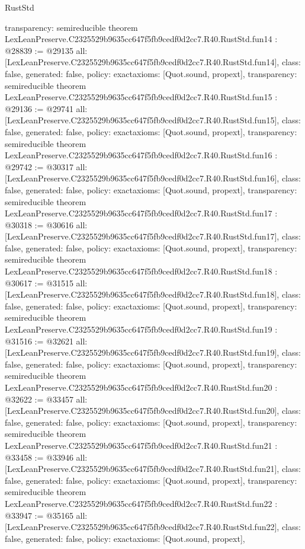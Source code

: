 \begin{lexlean}{RustStd}
\begin{coremodule}
{  transparency: semireducible
}
theorem LexLeanPreserve.C2325529b9635cc647f5fb9cedf0d2cc7.R40.RustStd.fun14 : @28839 := @29135 {
  all: [LexLeanPreserve.C2325529b9635cc647f5fb9cedf0d2cc7.R40.RustStd.fun14],
  class: false,
  generated: false,
  policy: exact{axioms: [Quot.sound, propext]},
  transparency: semireducible
}
theorem LexLeanPreserve.C2325529b9635cc647f5fb9cedf0d2cc7.R40.RustStd.fun15 : @29136 := @29741 {
  all: [LexLeanPreserve.C2325529b9635cc647f5fb9cedf0d2cc7.R40.RustStd.fun15],
  class: false,
  generated: false,
  policy: exact{axioms: [Quot.sound, propext]},
  transparency: semireducible
}
theorem LexLeanPreserve.C2325529b9635cc647f5fb9cedf0d2cc7.R40.RustStd.fun16 : @29742 := @30317 {
  all: [LexLeanPreserve.C2325529b9635cc647f5fb9cedf0d2cc7.R40.RustStd.fun16],
  class: false,
  generated: false,
  policy: exact{axioms: [Quot.sound, propext]},
  transparency: semireducible
}
theorem LexLeanPreserve.C2325529b9635cc647f5fb9cedf0d2cc7.R40.RustStd.fun17 : @30318 := @30616 {
  all: [LexLeanPreserve.C2325529b9635cc647f5fb9cedf0d2cc7.R40.RustStd.fun17],
  class: false,
  generated: false,
  policy: exact{axioms: [Quot.sound, propext]},
  transparency: semireducible
}
theorem LexLeanPreserve.C2325529b9635cc647f5fb9cedf0d2cc7.R40.RustStd.fun18 : @30617 := @31515 {
  all: [LexLeanPreserve.C2325529b9635cc647f5fb9cedf0d2cc7.R40.RustStd.fun18],
  class: false,
  generated: false,
  policy: exact{axioms: [Quot.sound, propext]},
  transparency: semireducible
}
theorem LexLeanPreserve.C2325529b9635cc647f5fb9cedf0d2cc7.R40.RustStd.fun19 : @31516 := @32621 {
  all: [LexLeanPreserve.C2325529b9635cc647f5fb9cedf0d2cc7.R40.RustStd.fun19],
  class: false,
  generated: false,
  policy: exact{axioms: [Quot.sound, propext]},
  transparency: semireducible
}
theorem LexLeanPreserve.C2325529b9635cc647f5fb9cedf0d2cc7.R40.RustStd.fun20 : @32622 := @33457 {
  all: [LexLeanPreserve.C2325529b9635cc647f5fb9cedf0d2cc7.R40.RustStd.fun20],
  class: false,
  generated: false,
  policy: exact{axioms: [Quot.sound, propext]},
  transparency: semireducible
}
theorem LexLeanPreserve.C2325529b9635cc647f5fb9cedf0d2cc7.R40.RustStd.fun21 : @33458 := @33946 {
  all: [LexLeanPreserve.C2325529b9635cc647f5fb9cedf0d2cc7.R40.RustStd.fun21],
  class: false,
  generated: false,
  policy: exact{axioms: [Quot.sound, propext]},
  transparency: semireducible
}
theorem LexLeanPreserve.C2325529b9635cc647f5fb9cedf0d2cc7.R40.RustStd.fun22 : @33947 := @35165 {
  all: [LexLeanPreserve.C2325529b9635cc647f5fb9cedf0d2cc7.R40.RustStd.fun22],
  class: false,
  generated: false,
  policy: exact{axioms: [Quot.sound, propext]},
}
\end{coremodule}
\end{lexlean}
